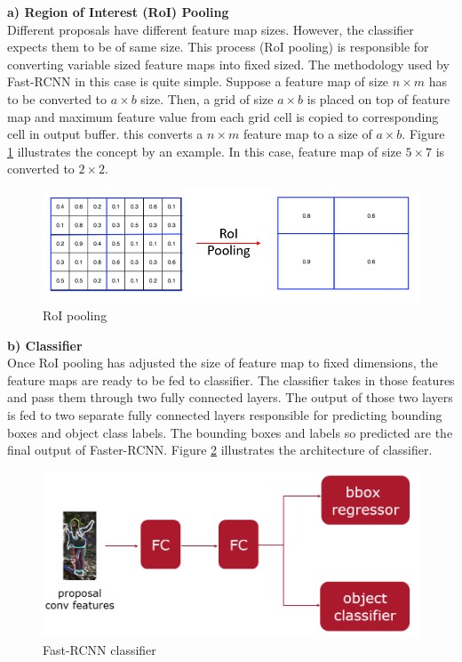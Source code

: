 \textbf{a) Region of Interest (RoI) Pooling} \\
Different proposals have different feature map sizes. However, the classifier expects them to be of same size. This process (RoI pooling) is responsible for converting variable sized feature maps into fixed sized. The methodology used by Fast-RCNN in this case is quite simple. Suppose a feature map of size $n\times m$ has to be converted to $a \times b$ size. Then, a grid of size $a \times b$ is placed on top of feature map and maximum feature value from each grid cell is copied to corresponding cell in output buffer. this converts a $n\times m$ feature map to a size of $a \times b$. Figure \ref{fig:roi-pooling} illustrates the concept by an example. In this case, feature map of size $5 \times 7$ is converted to $2 \times 2$.

\begin{figure}
    \centering
    \includegraphics[width=\linewidth]{images/roi-pooling.PNG}
    \caption{RoI pooling}
    \label{fig:roi-pooling}
\end{figure}

\textbf{b) Classifier} \\
Once RoI pooling has adjusted the size of feature map to fixed dimensions, the feature maps are ready to be fed to classifier. The classifier takes in those features and pass them through two fully connected layers. The output of those two layers is fed to two separate fully connected layers responsible for predicting bounding boxes and object class labels. The bounding boxes and labels so predicted are the final output of Faster-RCNN. Figure \ref{fig:classifier} illustrates the architecture of classifier.

\begin{figure}
    \centering
    \includegraphics[width=\linewidth]{images/classifier.PNG}
    \caption{Fast-RCNN classifier}
    \label{fig:classifier}
\end{figure}


